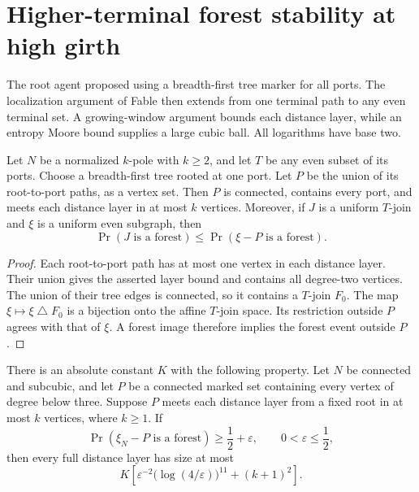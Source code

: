 \section{Higher-terminal forest stability at high girth}
\label{sec:path-high-girth-terminal-forests}

The root agent proposed using a breadth-first tree marker for all ports.
The localization argument of Fable then extends from one terminal path to any even terminal set.
A growing-window argument bounds each distance layer, while an entropy Moore bound supplies a large cubic ball.
All logarithms have base two.

\begin{lemma}
\label{lem:path-bfs-terminal-marker}
Let $N$ be a normalized $k$-pole with $k\ge2$, and let $T$ be any even subset of its ports.
Choose a breadth-first tree rooted at one port.
Let $P$ be the union of its root-to-port paths, as a vertex set.
Then $P$ is connected, contains every port, and meets each distance layer in at most $k$ vertices.
Moreover, if $J$ is a uniform $T$-join and $\xi$ is a uniform even subgraph, then
\[
 \Pr(J\text{ is a forest})
 \le\Pr(\xi-P\text{ is a forest}).
\]
\end{lemma}

\begin{proof}
Each root-to-port path has at most one vertex in each distance layer.
Their union gives the asserted layer bound and contains all degree-two vertices.
The union of their tree edges is connected, so it contains a $T$-join $F_0$.
The map $\xi\mapsto\xi\mathbin\triangle F_0$ is a bijection onto the affine $T$-join space.
Its restriction outside $P$ agrees with that of $\xi$.
A forest image therefore implies the forest event outside $P$.
\end{proof}

\begin{lemma}
\label{lem:path-thin-marker-layer-width}
There is an absolute constant $K$ with the following property.
Let $N$ be connected and subcubic, and let $P$ be a connected marked set containing every vertex of degree below three.
Suppose $P$ meets each distance layer from a fixed root in at most $k$ vertices, where $k\ge1$.
If
\[
 \Pr(\xi_N-P\text{ is a forest})\ge\frac12+\varepsilon,
 \qquad 0<\varepsilon\le\frac12,
\]
then every full distance layer has size at most
\[
 K\left[
 \varepsilon^{-2}\bigl(\log(4/\varepsilon)\bigr)^{11}
 +(k+1)^2\right].
\]
\end{lemma}

